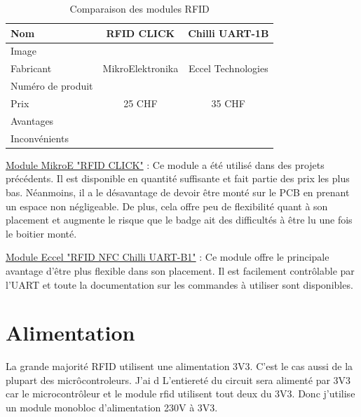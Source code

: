 \begin{table}[h]
	\centering
	\begin{tabular}{|l|c|c|}
		\hline
		Nom               & RFID CLICK       & Chilli UART-1B     \\ \hline
		Image             &                  &                    \\ \hline
		Fabricant         & MikroElektronika & Eccel Technologies \\ \hline
		Numéro de produit &                  &                    \\ \hline
		Prix              & 25 CHF           & 35 CHF             \\ \hline
		Avantages         &                  &                    \\ \hline
		Inconvénients     &                  &                    \\ \hline
	\end{tabular}
	\caption{Comparaison des modules RFID}
	\label{tab:comp-rfid}
\end{table}


\vspace{5pt}
\href{https://www.mikroe.com/rfid-click}{Module MikroE "RFID CLICK"} : Ce module a été utilisé dans des projets précédents. Il est disponible en quantité suffisante et fait partie des prix les plus bas. Néanmoins, il a le désavantage de devoir être monté sur le PCB en prenant un espace non négligeable. De plus, cela offre peu de flexibilité quant à son placement et augmente le risque que le badge ait des difficultés à être lu une fois le boitier monté. 

\vspace{5pt}
\href{https://www.mikroe.com/rfid-click}{Module Eccel "RFID NFC Chilli UART-B1"} : Ce module offre le principale avantage d'être plus flexible dans son placement. Il est facilement contrôlable par l'UART et toute la documentation sur les commandes à utiliser sont disponibles. 

\section{Alimentation}
La grande majorité RFID utilisent une alimentation 3V3. C'est le cas aussi de la plupart des micrôcontroleurs. J'ai d
L'entiereté du circuit sera alimenté par 3V3 car le microcontrôleur et le module rfid utilisent tout deux du 3V3. 
Donc j'utilise un module monobloc d'alimentation 230V à 3V3. 

